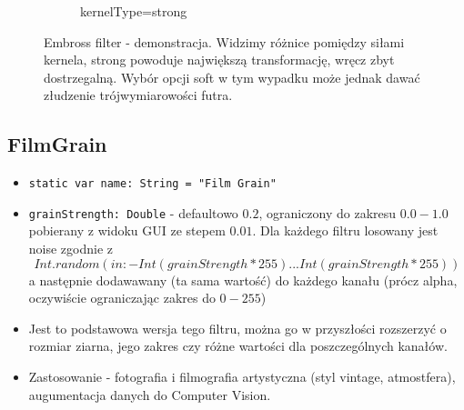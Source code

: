 \documentclass[a4paper]{article}
\begin{document}
\begin{figure}[H]
\begin{subfigure}{0.2\textwidth}
        \caption{kernelType=strong}
        \label{fig:dog_embross_strong}
    \end{subfigure}
    \caption{Embross filter - demonstracja. Widzimy różnice pomiędzy siłami kernela, strong powoduje największą transformację, wręcz zbyt dostrzegalną. Wybór opcji soft w tym wypadku może jednak dawać złudzenie trójwymiarowości futra.}
    \label{fig:embross}
\end{figure}

\subsection{FilmGrain}

\begin{itemize}
    \item \texttt{static var name: String = "Film Grain"}
    \item \texttt{grainStrength: Double} - defaultowo $0.2$, ograniczony do zakresu $0.0-1.0$ pobierany z widoku GUI ze stepem $0.01$. Dla każdego filtru losowany jest noise zgodnie z
          $$
              Int.random(in: -Int(grainStrength * 255)...Int(grainStrength * 255))
          $$
          a następnie dodawawany (ta sama wartość) do każdego kanału (prócz alpha, oczywiście ograniczając zakres do $0-255$)
    \item Jest to podstawowa wersja tego filtru, można go w przyszłości rozszerzyć o rozmiar ziarna, jego zakres czy różne wartości dla poszczególnych kanałów.
    \item Zastosowanie - fotografia i filmografia artystyczna (styl vintage, atmostfera), augumentacja danych do Computer Vision.
\end{itemize}
\end{document}
